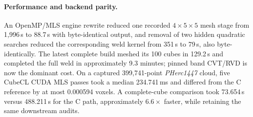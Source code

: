 \paragraph{Performance and backend parity.}
An OpenMP/MLS engine rewrite reduced one recorded $4\times5\times5$ mesh stage from 1,996\,s to 88.7\,s with byte-identical output, and removal of two hidden quadratic searches reduced the corresponding weld kernel from 351\,s to 79\,s, also byte-identically. The latest complete build meshed its 100 cubes in 129.2\,s and completed the full weld in approximately 9.3 minutes; pinned band CVT/RVD is now the dominant cost. On a captured 399,741-point {\em PHerc1447} cloud, five CubeCL CUDA MLS passes took a median 234.741\,ms and differed from the C reference by at most 0.000594 voxels. A complete-cube comparison took 73.654\,s versus 488.211\,s for the C path, approximately $6.6\times$ faster, while retaining the same downstream audits.

